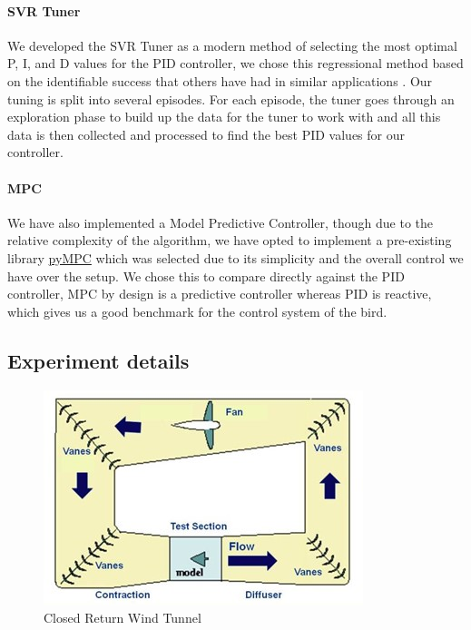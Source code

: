     \paragraph{SVR Tuner} We developed the SVR Tuner as a modern method
    of selecting the most optimal P, I, and D values for the PID controller,
    we chose this regressional method based on the identifiable success that
    others have had in similar applications \cite{12}. Our tuning is split into
    several episodes. For each episode, the tuner goes through an exploration
    phase to build up the data for the tuner to work with and all this data
    is then collected and processed to find the best PID values for our controller.

    \paragraph{MPC} We have also implemented a Model Predictive Controller, though
    due to the relative complexity of the algorithm, we have opted to implement a
    pre-existing library \href{https://github.com/forgi86/pyMPC}{pyMPC} which was selected due to its simplicity and the 
    overall control we have over the setup. We chose this to compare directly
    against the PID controller, MPC by design is a predictive controller
    whereas PID is reactive, which gives us a good benchmark for the control
    system of the bird.

    \clearpage
    \subsection{Experiment details}
    \setlength{\intextsep}{0pt}
    \begin{figure}
        \includegraphics[width=\textwidth/2]{./img/Fig2_wind_tunnel_design.jpg}
        \caption{\label{fig:figure 2} Closed Return Wind Tunnel \cite{10}}
    \end{figure}
